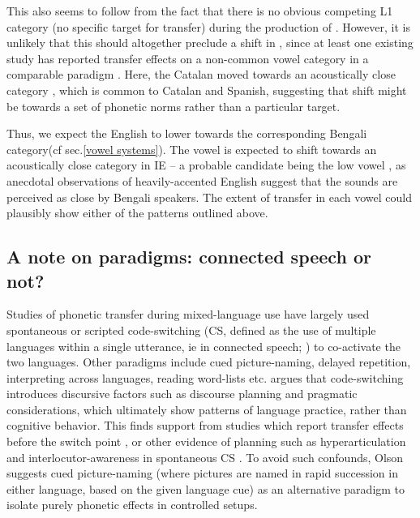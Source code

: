 \documentclass[11pt]{article}
\newcommand{\nt}[1]{\textipa{[#1]}} %
\begin{document}
 This also seems to follow from the fact that there is no obvious competing L1 category (no specific target for transfer) during the production of \nt{2}. However, it is unlikely that this should altogether preclude a shift in \nt{2}, since at least one existing study has reported transfer effects on a non-common vowel category in a comparable paradigm \cite{simonet2014phonetic}. Here, the Catalan \nt{O} moved towards an acoustically close category \nt{o}, which is common to Catalan and Spanish, suggesting that shift might be towards a set of phonetic norms rather than a particular target. 
 
 Thus, we expect the English \nt{\ae} to lower towards the corresponding Bengali category(cf sec.\ref{vowel systems}). The vowel \nt{2} is expected to shift towards an acoustically close category in IE -- a probable candidate being the low vowel \nt{a:}, as anecdotal observations of heavily-accented English suggest that the sounds are perceived as close by Bengali speakers. The extent of transfer in each vowel could plausibly show either of the patterns outlined above.
    

\subsection{A note on paradigms: connected speech or not?}

Studies of phonetic transfer during mixed-language use have largely used spontaneous or scripted code-switching (CS, defined as the use of multiple languages within a single utterance, ie in connected speech; ) to co-activate the two languages. Other paradigms include cued picture-naming, delayed repetition, interpreting across languages, reading word-lists etc.  argues that code-switching introduces discursive factors such as discourse planning and pragmatic considerations, which ultimately show patterns of language practice, rather than cognitive behavior. This finds support from studies which report transfer effects before the switch point \cite{bullock2009trying}, or other evidence of planning such as hyperarticulation \cite{muldner2019phonetics} and interlocutor-awareness in spontaneous CS \cite{khattab2013phonetic}. To avoid such confounds, Olson suggests cued picture-naming (where pictures are named in rapid succession in either language, based on the given language cue) as an alternative paradigm to isolate purely phonetic effects in controlled setups. 
\end{document}
